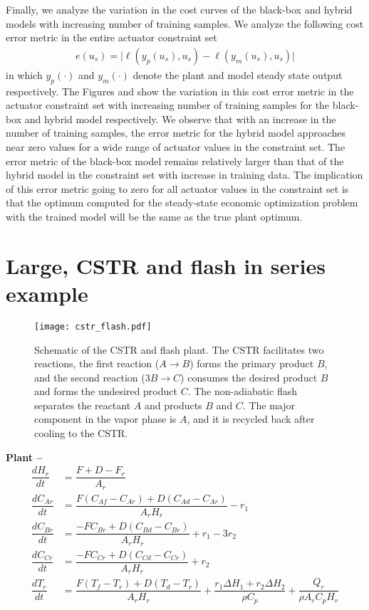 \documentclass{article}
\begin{document}
Finally, we analyze the variation in the cost curves of the black-box and hybrid
models with increasing number of training samples. We analyze the following cost
error metric in the entire actuator constraint set
\begin{align*}
  e(u_s) = \vert \ell(y_p(u_s), u_s) - \ell(y_m(u_s), u_s) \vert
\end{align*}
in which $y_p(\cdot)$ and $y_m(\cdot)$ denote the plant and model steady state
output respectively. The Figures and show the variation in this cost error metric in the
actuator constraint set with increasing number of training samples for the
black-box and hybrid model respectively. We observe that with an increase in the
number of training samples, the error metric for the hybrid model approaches
near zero values for a wide range of actuator values in the constraint set. The
error metric of the black-box model remains relatively larger than that of the
hybrid model in the constraint set with increase in training data. The
implication of this error metric going to zero for all actuator values in the
constraint set is that the optimum computed for the steady-state economic
optimization problem with the trained model will be the same as the true plant
optimum.

\section{Large, CSTR and flash in series example}
\begin{figure}[!h]
  \centering
  \texttt{[image: cstr\_flash.pdf]}
  \caption{Schematic of the CSTR and flash plant. The CSTR facilitates two 
  reactions, the first reaction ($A \rightarrow B$) forms the primary product $B$, and the second reaction ($3B \rightarrow C$) 
  consumes the desired product $B$ and forms the undesired product $C$.
  The non-adiabatic flash separates the reactant $A$ and 
  products $B$ and $C$. The major component in the vapor phase 
  is $A$, and it is recycled back after cooling to the CSTR.}
  \label{fig:cstr_flash}
\end{figure}
\textbf{Plant -- }
\begin{align*}
  \dfrac{dH_r}{dt} &= \dfrac{F + D -F_r}{A_r}\\
  \dfrac{dC_{Ar}}{dt} &= \dfrac{F(C_{Af} -C_{Ar}) +
                         D(C_{Ad} -C_{Ar})}{A_rH_r} - r_1 \\
  \dfrac{dC_{Br}}{dt} &= \dfrac{-FC_{Br} + 
                          D(C_{Bd} -C_{Br})}{A_rH_r} + r_1 -3r_2\\
  \dfrac{dC_{Cr}}{dt} &= \dfrac{-FC_{Cr} + 
  D(C_{Cd} -C_{Cr})}{A_rH_r} + r_2\\
  \dfrac{dT_r}{dt} &= \dfrac{F(T_f - T_r) + D(T_d -T_r)}{A_rH_r} + 
                      \dfrac{r_1\Delta H_1 + r_2\Delta H_2}{\rho C_p} + 
                      \dfrac{Q_r}{\rho A_r C_p H_r}\\
\end{align*}
\end{document}
